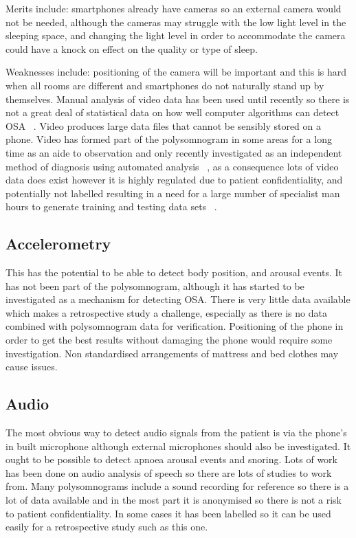 Merits include: smartphones already have cameras so an external camera would not be needed, although the cameras may struggle with the low light level in the sleeping space, and changing the light level in order to accommodate the camera could have a knock on effect on the quality or type of sleep. 

Weaknesses include: positioning of the camera will be important and this is hard when all rooms are different and smartphones do not naturally stand up by themselves. Manual analysis of video data has been used until recently so there is not a great deal of statistical data on how well computer algorithms can detect OSA ~\cite{roebuck2014review}. Video produces large data files that cannot be sensibly stored on a phone. Video has formed part of the polysomnogram in some areas for a long time as an aide to observation and only recently investigated as an independent method of diagnosis using automated analysis ~\cite{nhschoicesdiagnosis}, as a consequence lots of video data does exist however it is highly regulated due to patient confidentiality, and potentially not labelled resulting in a need for a large number of specialist man hours to generate training and testing data sets ~\cite{confidentialitynhs}.

\subsection{Accelerometry}
This has the potential to be able to detect body position, and arousal events. It has not been part of the polysomnogram, although it has started to be investigated as a mechanism for detecting OSA. There is very little data available which makes a retrospective study a challenge, especially as there is no data combined with polysomnogram data for verification. Positioning of the phone in order to get the best results without damaging the phone would require some investigation. Non standardised arrangements of mattress and bed clothes may cause issues. 

\subsection{Audio}
The most obvious way to detect audio signals from the patient is via the phone’s in built microphone although external microphones should also be investigated. It ought to be possible to detect apnoea arousal events and snoring. Lots of work has been done on audio analysis of speech so there are lots of studies to work from. Many polysomnograms include a sound recording for reference so there is a lot of data available and in the most part it is anonymised so there is not a risk to patient confidentiality. In some cases it has been labelled so it can be used easily for a retrospective study such as this one. 

